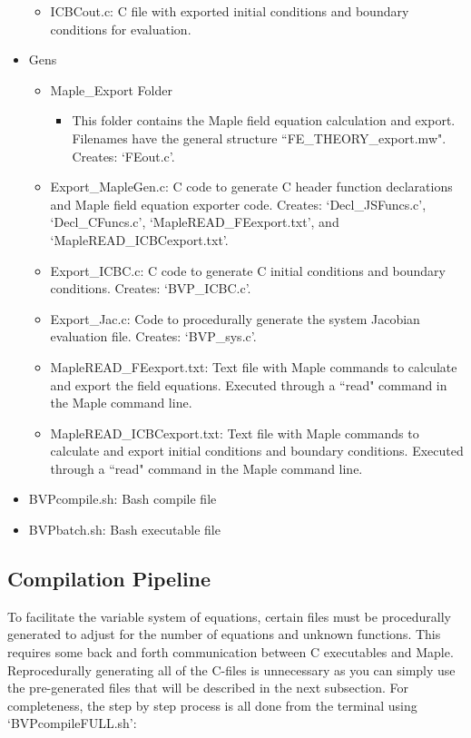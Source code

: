 \documentclass{article}
\begin{document}
\begin{itemize}
\begin{itemize}
\item ICBCout.c: C file with exported initial conditions and boundary conditions for evaluation.
\end{itemize}
\item Gens
\begin{itemize}
\item Maple\_Export Folder
\begin{itemize}
\item This folder contains the Maple field equation calculation and export. Filenames have the general structure ``FE\_THEORY\_export.mw". Creates: `FEout.c'.
\end{itemize}
\item Export\_MapleGen.c: C code to generate C header function declarations and Maple field equation exporter code. Creates: `Decl\_JSFuncs.c', `Decl\_CFuncs.c', `MapleREAD\_FEexport.txt', and `MapleREAD\_ICBCexport.txt'.
\item Export\_ICBC.c: C code to generate C initial conditions and boundary conditions. Creates: `BVP\_ICBC.c'.
\item Export\_Jac.c: Code to procedurally generate the system Jacobian evaluation file. Creates: `BVP\_sys.c'.
\item MapleREAD\_FEexport.txt: Text file with Maple commands to calculate and export the field equations. Executed through a ``read" command in the Maple command line.
\item MapleREAD\_ICBCexport.txt: Text file with Maple commands to calculate and export initial conditions and boundary conditions. Executed through a ``read" command in the Maple command line.
\end{itemize}
\item BVPcompile.sh: Bash compile file
\item BVPbatch.sh: Bash executable file
\end{itemize}



\subsection{Compilation Pipeline}
\label{ssec:exec}

To facilitate the variable system of equations, certain files must be procedurally generated to adjust for the number of equations and unknown functions. This requires some back and forth communication between C executables and Maple. Reprocedurally generating all of the C-files is unnecessary as you can simply use the pre-generated files that will be described in the next subsection. For completeness, the step by step process is all done from the terminal using `BVPcompileFULL.sh':
\end{document}

